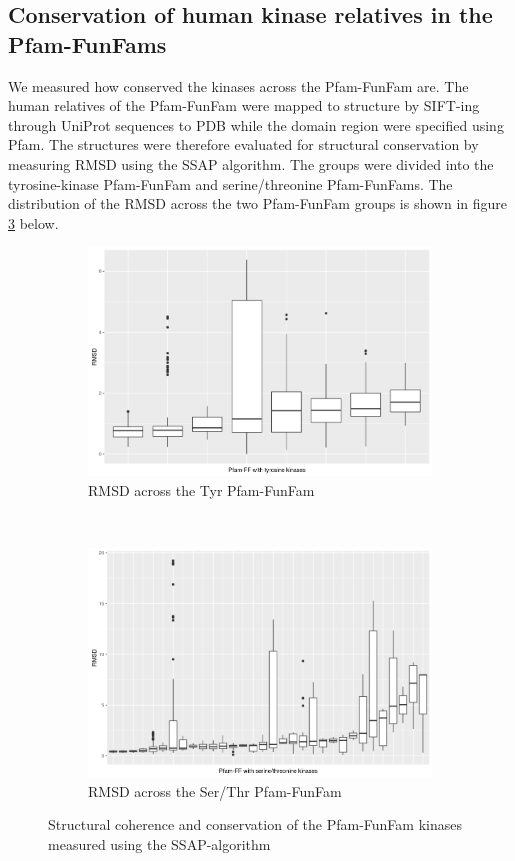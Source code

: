 \documentclass[a4paper, 11pt]{article}
\begin{document}
\subsection*{Conservation of human kinase relatives in the Pfam-FunFams}
We measured how conserved the kinases across the Pfam-FunFam are. The human relatives of the Pfam-FunFam were mapped to structure by SIFT-ing through UniProt sequences to PDB while the domain region were specified using Pfam. The structures were therefore evaluated for structural conservation by measuring RMSD using the SSAP algorithm. The groups were divided into the tyrosine-kinase Pfam-FunFam and serine/threonine Pfam-FunFams. The distribution of the RMSD across the two Pfam-FunFam groups is shown in figure \ref{ssap_measure} below.
\begin{figure}[H]
\centering
\begin{subfigure}{.8\textwidth}
  \centering
  \includegraphics[width=\linewidth]{figures/ssap_tyr.png}
  \caption{RMSD across the Tyr Pfam-FunFam}
  \label{ssap_tyr}
\end{subfigure}\\
\begin{subfigure}{.8\textwidth}
  \centering
  \includegraphics[width=\linewidth]{figures/ssap_ser.png}
    \caption{RMSD across the Ser/Thr Pfam-FunFam}
  \label{ssap_ser}
\end{subfigure}
\caption{Structural coherence and conservation of the Pfam-FunFam kinases measured using the SSAP-algorithm}
\label{ssap_measure}
\end{figure}
\end{document}
